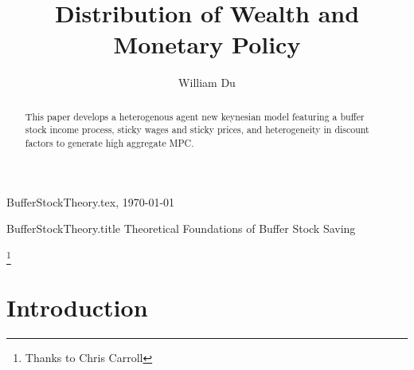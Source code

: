 \documentclass[titlepage]{\econtex}\providecommand{\texname}{BufferStockTheory}
\providecommand{\onlyinsubfile}{}
\providecommand{\notinsubfile}{}
\renewcommand{\onlyinsubfile}[1]{}
\renewcommand{\notinsubfile}[1]{#1}
\begin{document}

\renewcommand{\onlyinsubfile}[1]{}\renewcommand{\notinsubfile}[1]{#1} 

\hfill{\tiny \texname.tex, \today}

\begin{verbatimwrite}{\texname.title}
Theoretical Foundations of Buffer Stock Saving
\end{verbatimwrite}


\title{Distribution of Wealth and Monetary Policy}

\author{William Du\authNum}





\maketitle 


\hypertarget{abstract}{}
\begin{abstract}
  This paper develops a heterogenous agent new keynesian model featuring a buffer stock income process,  sticky wages and sticky prices, and heterogeneity in discount factors to generate high aggregate MPC.
\end{abstract}


\begin{authorsinfo}
\end{authorsinfo}

\thanks{Thanks to Chris Carroll }

\titlepagefinish


\newtheorem{defn}{Definition}
\newtheorem{theorem}{Theorem}

\hypertarget{Introduction}{}
\section{Introduction}

\label{sec:intro}
\end{document}

